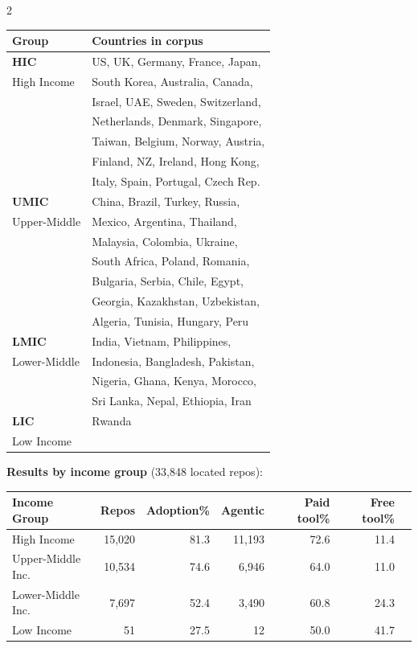 \documentclass[10pt,a4paper]{article}
\begin{document}
\begin{multicols}{2}
\begin{tabular}{@{}ll@{}}
\toprule
Group & Countries in corpus \\
\midrule
\textbf{HIC} & US, UK, Germany, France, Japan, \\
High Income  & South Korea, Australia, Canada, \\
             & Israel, UAE, Sweden, Switzerland, \\
             & Netherlands, Denmark, Singapore, \\
             & Taiwan, Belgium, Norway, Austria, \\
             & Finland, NZ, Ireland, Hong Kong, \\
             & Italy, Spain, Portugal, Czech Rep. \\[4pt]
\textbf{UMIC} & China, Brazil, Turkey, Russia, \\
Upper-Middle  & Mexico, Argentina, Thailand, \\
              & Malaysia, Colombia, Ukraine, \\
              & South Africa, Poland, Romania, \\
              & Bulgaria, Serbia, Chile, Egypt, \\
              & Georgia, Kazakhstan, Uzbekistan, \\
              & Algeria, Tunisia, Hungary, Peru \\[4pt]
\textbf{LMIC} & India, Vietnam, Philippines, \\
Lower-Middle  & Indonesia, Bangladesh, Pakistan, \\
              & Nigeria, Ghana, Kenya, Morocco, \\
              & Sri Lanka, Nepal, Ethiopia, Iran \\[4pt]
\textbf{LIC}  & Rwanda \\
Low Income    & \\
\bottomrule
\end{tabular}

\end{multicols}

\vspace{6pt}
\textbf{Results by income group} (33,848 located repos):

\vspace{3pt}
\begin{tabular}{@{}lrrrrrr@{}}
\toprule
Income Group & Repos & Adoption\% & Agentic & Paid tool\% & Free tool\% \\
\midrule
High Income        & 15,020 & 81.3 & 11,193 & 72.6 & 11.4 \\
Upper-Middle Inc.  & 10,534 & 74.6 &  6,946 & 64.0 & 11.0 \\
Lower-Middle Inc.  &  7,697 & 52.4 &  3,490 & 60.8 & 24.3 \\
Low Income         &     51 & 27.5 &     12 & 50.0 & 41.7 \\
\bottomrule
\end{tabular}
\end{document}
